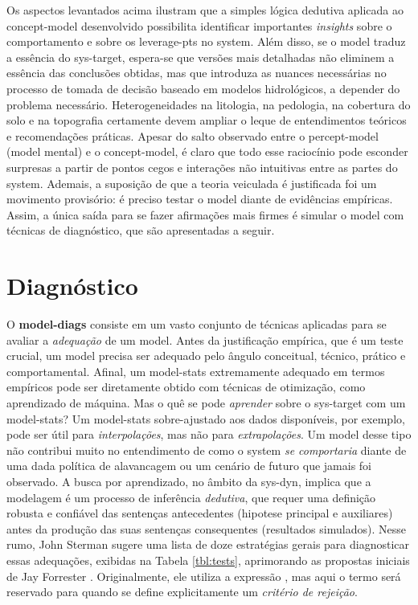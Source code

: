\documentclass[./main.tex]{subfiles}
\begin{document}
\par Os aspectos levantados acima ilustram que a simples lógica dedutiva aplicada ao \gls{concept-model} desenvolvido possibilita identificar importantes \textit{insights} sobre o comportamento e sobre os \gls{leverage-pts} no \gls{system}. Além disso, se o \gls{model} traduz a essência do \gls{sys-target}, espera-se que versões mais detalhadas não eliminem a essência das conclusões obtidas, mas que introduza as nuances necessárias no processo de tomada de decisão baseado em modelos hidrológicos, a depender do problema necessário. Heterogeneidades na litologia, na pedologia, na cobertura do solo e na topografia certamente devem ampliar o leque de entendimentos teóricos e recomendações práticas. Apesar do salto observado entre o \gls{percept-model} (\gls{model} mental) e o \gls{concept-model}, é claro que todo esse raciocínio pode esconder surpresas a partir de pontos cegos e interações não intuitivas entre as partes do \gls{system}. Ademais, a suposição de que a \gls{teoria} veiculada é justificada foi um movimento provisório: é preciso testar o \gls{model} diante de evidências empíricas. Assim, a única saída para se fazer afirmações mais firmes é simular o \gls{model} com técnicas de diagnóstico, que são apresentadas a seguir.

\section{Diagnóstico} \label{sec:sys:diags}

\par O \textbf{\gls{model-diags}} consiste em um vasto conjunto de técnicas aplicadas para se avaliar a \textit{adequação} de um \gls{model}. Antes da justificação empírica, que é um teste crucial, um \gls{model} precisa ser adequado pelo ângulo conceitual, técnico, prático e comportamental. Afinal, um \gls{model-stats} extremamente adequado em termos empíricos pode ser diretamente obtido com técnicas de otimização, como aprendizado de máquina. Mas o quê se pode \textit{aprender} sobre o \gls{sys-target} com um \gls{model-stats}? Um \gls{model-stats} sobre-ajustado aos dados disponíveis, por exemplo, pode ser útil para \textit{interpolações}, mas não para \textit{extrapolações}. Um \gls{model} desse tipo não contribui muito no entendimento de como o \gls{system} \textit{se comportaria} diante de uma dada política de alavancagem ou um cenário de futuro que jamais foi observado. A busca por aprendizado, no âmbito da \gls{sys-dyn}, implica que a modelagem é um processo de inferência \textit{dedutiva}, que requer uma definição robusta e confiável das sentenças antecedentes (\gls{hipotese} principal e auxiliares) antes da produção das suas sentenças consequentes (resultados simulados). Nesse rumo, John Sterman sugere uma lista de doze estratégias gerais para diagnosticar essas adequações, exibidas na Tabela \ref{tbl:tests}, aprimorando as propostas iniciais de Jay Forrester \cite{sterman2000}. Originalmente, ele utiliza a expressão , mas aqui o termo  será reservado para quando se define explicitamente um \textit{critério de rejeição}. 
\end{document}
